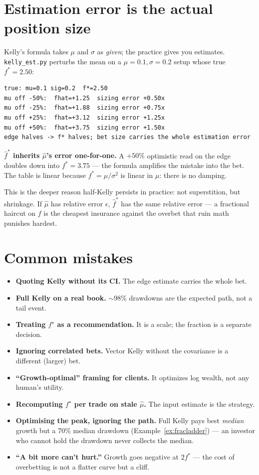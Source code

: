 \section{Estimation error is the actual position size}\label{sec:esterr}
Kelly's formula takes $\mu$ and $\sigma$ as \emph{given}; the
practice gives you estimates. \texttt{kelly\_est.py} perturbs
the mean on a $\mu{=}0.1,\sigma{=}0.2$ setup whose true
$f^*=2.50$:
\begin{verbatim}
true: mu=0.1 sig=0.2  f*=2.50
mu off -50%:  fhat=+1.25  sizing error +0.50x
mu off -25%:  fhat=+1.88  sizing error +0.75x
mu off +25%:  fhat=+3.12  sizing error +1.25x
mu off +50%:  fhat=+3.75  sizing error +1.50x
edge halves -> f* halves; bet size carries the whole estimation error
\end{verbatim}
\begin{example}\label{ex:esterr}
\textbf{$\hat f^*$ inherits $\hat\mu$'s error one-for-one.}
A $+50\%$ optimistic read on the edge doubles down into
$f^*=3.75$ --- the formula amplifies the mistake into the bet.
The table is linear because $f^*=\mu/\sigma^2$ is linear in
$\mu$: there is no damping.
\begin{solution}
This is the deeper reason half-Kelly persists in practice: not
superstition, but shrinkage. If $\hat\mu$ has relative error
$\epsilon$, $\hat f^*$ has the same relative error --- a
fractional haircut on $f$ is the cheapest insurance against the
overbet that ruin math punishes hardest.
\end{solution}
\end{example}
\section{Common mistakes}
\begin{itemize}
\item \textbf{Quoting Kelly without its CI.} The edge estimate carries the whole bet.
\item \textbf{Full Kelly on a real book.} $\sim$98\% drawdowns are the expected path,
  not a tail event.
\item \textbf{Treating $f^\star$ as a recommendation.} It is a scale; the fraction is
  a separate decision.
\item \textbf{Ignoring correlated bets.} Vector Kelly without the covariance is a
  different (larger) bet.
\item \textbf{``Growth-optimal'' framing for clients.} It optimizes log wealth, not
  any human's utility.
\item \textbf{Recomputing $f^\star$ per trade on stale $\hat\mu$.} The input estimate is
  the strategy.
\item \textbf{Optimising the peak, ignoring the path.}
Full Kelly pays best \emph{median} growth but a 70\% median
drawdown (Example~\ref{ex:fracladder}) --- an investor who cannot
hold the drawdown never collects the median.
\item \textbf{``A bit more can't hurt.''} Growth goes negative at
$2f^*$ --- the cost of overbetting is not a flatter curve but a
cliff.\end{itemize}

